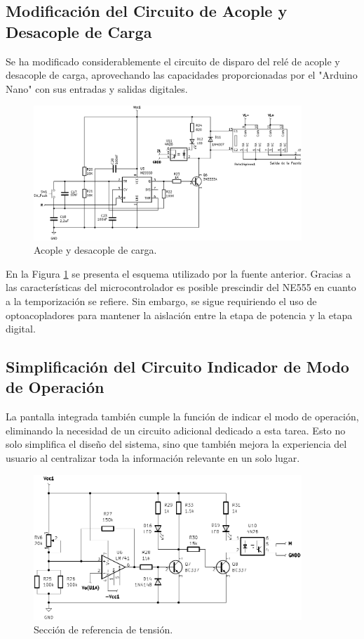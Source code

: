 \subsection{Modificación del Circuito de Acople y Desacople de Carga}\par 
Se ha modificado considerablemente el circuito de disparo del relé de acople y desacople de carga, aprovechando las capacidades proporcionadas por el "Arduino Nano" con sus entradas y salidas digitales.
\begin{figure}[H]
    \centering
    \includegraphics[width=0.9\textwidth]{./imagenes/conexion_carga.PNG}
    \caption{Acople y desacople de carga.}
    \label{F:conexion_carga}
\end{figure}\par 
En la Figura \ref{F:conexion_carga} se presenta el esquema utilizado por la fuente anterior. Gracias a las características del microcontrolador es posible prescindir del NE555 en cuanto a la temporización se refiere. Sin embargo, se sigue requiriendo el uso de optoacopladores para mantener la aislación entre la etapa de potencia y la etapa digital.

\subsection{Simplificación del Circuito Indicador de Modo de Operación}
La pantalla integrada también cumple la función de indicar el modo de operación, eliminando la necesidad de un circuito adicional dedicado a esta tarea. Esto no solo simplifica el diseño del sistema, sino que también mejora la experiencia del usuario al centralizar toda la información relevante en un solo lugar.
\begin{figure}[H]
    \centering
    \includegraphics[width=0.9\textwidth]{./imagenes/modo_operacion.PNG}
    \caption{Sección de referencia de tensión.}
    \label{F:modo_operacion}
\end{figure}

